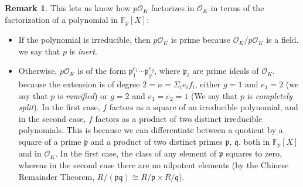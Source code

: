 \documentclass[11pt]{article}
\theoremstyle{definition}
\newtheorem{rk}[theorem]{Remark}
\begin{document}
    \begin{rk}
        This lets us know how $p\mathcal{O}_K$ factorizes in $\mathcal{O}_K$
        in terms of the factorization of a polynomial in $\mathbb{F}_p[X]$:
        \begin{itemize}
            \item If the polynomial is irreducible, then $p\mathcal{O}_K$ is prime because $\mathcal{O}_K / p \mathcal{O}_K$ is a field.
                we say that $p$ is \emph{inert}.
            \item Otherwise, $p\mathcal{O}_K$ is of the form $\mathfrak{p}_1^{e_1} \cdots \mathfrak{p}_g^{e_g}$,
                where $\mathfrak{p}_i$ are prime ideals of $\mathcal{O}_K$.
                because the extension is of degree $2 = n = \varSigma_i e_i f_i$,
                either $g=1$ and $e_1 = 2$ (we say that $p$ is \emph{ramified}) or $g=2$ and $e_1 = e_2 = 1$ (We say that $p$ is \emph{completely split}).
                In the first case, $f$ factors as a square of an irreducible polynomial,
                and in the second case, $f$ factors as a product of two distinct irreducible polynomials.
                This is because we can differentiate between a quotient by a square of a prime $\mathfrak{p}$ and a product of two distinct primes $\mathfrak{p}$, $\mathfrak{q}$.
                both in $\mathbb{F}_p[X]$ and in $\mathcal{O}_K$.
                In the first case, the class of any element of $\mathfrak{p}$ squares to zero,
                whereas in the second case there are no nilpotent elements (by the Chinese Remainder Theorem,
                $R/(\mathfrak{p}\mathfrak{q}) \cong R/\mathfrak{p} \times R/\mathfrak{q}$).
        \end{itemize}
    \end{rk}
\end{document}

